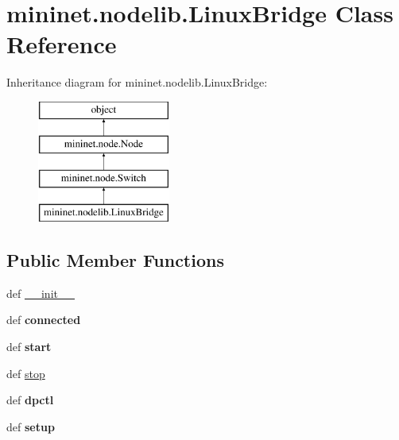 \hypertarget{classmininet_1_1nodelib_1_1LinuxBridge}{\section{mininet.\-nodelib.\-Linux\-Bridge Class Reference}
\label{classmininet_1_1nodelib_1_1LinuxBridge}
}
Inheritance diagram for mininet.\-nodelib.\-Linux\-Bridge\-:\begin{figure}[H]
\begin{center}
\leavevmode
\includegraphics[height=4.000000cm]{classmininet_1_1nodelib_1_1LinuxBridge}
\end{center}
\end{figure}
\subsection*{Public Member Functions}
\begin{DoxyCompactItemize}
\item 
def \hyperlink{classmininet_1_1nodelib_1_1LinuxBridge_a76fa73a4d276034a1d744430a3b03f10}{\-\_\-\-\_\-init\-\_\-\-\_\-}
\item 
\hypertarget{classmininet_1_1nodelib_1_1LinuxBridge_adad4da2be2d09a0c8f80c404e4b2c280}{def {\bfseries connected}}\label{classmininet_1_1nodelib_1_1LinuxBridge_adad4da2be2d09a0c8f80c404e4b2c280}

\item 
\hypertarget{classmininet_1_1nodelib_1_1LinuxBridge_a426f57d257675dd2783eb3233f785bfa}{def {\bfseries start}}\label{classmininet_1_1nodelib_1_1LinuxBridge_a426f57d257675dd2783eb3233f785bfa}

\item 
def \hyperlink{classmininet_1_1nodelib_1_1LinuxBridge_a0c351e04801bc1c3d0c3f2b3916dbc57}{stop}
\item 
\hypertarget{classmininet_1_1nodelib_1_1LinuxBridge_aa561b50171ac27e46f0e8ab7f6060d0c}{def {\bfseries dpctl}}\label{classmininet_1_1nodelib_1_1LinuxBridge_aa561b50171ac27e46f0e8ab7f6060d0c}

\item 
\hypertarget{classmininet_1_1nodelib_1_1LinuxBridge_aec51b470d91325dc41eeb1d05c9fb259}{def {\bfseries setup}}\label{classmininet_1_1nodelib_1_1LinuxBridge_aec51b470d91325dc41eeb1d05c9fb259}

\end{DoxyCompactItemize}

